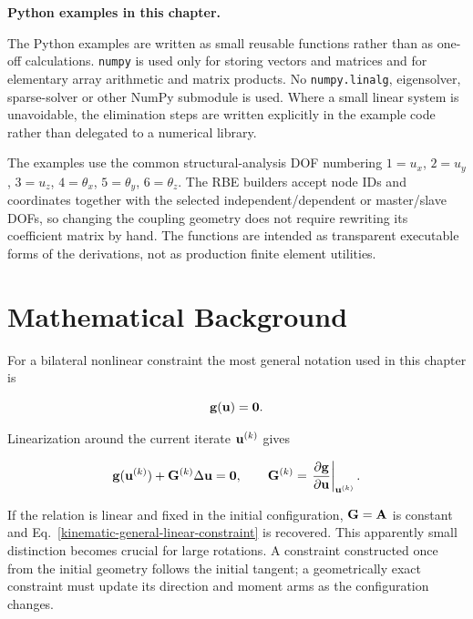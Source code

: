 \begin{bbox}
\textbf{Python examples in this chapter.}

The Python examples are written as small reusable functions rather than as
one-off calculations. \texttt{numpy} is used only for storing vectors and
matrices and for elementary array arithmetic and matrix products. No
\texttt{numpy.linalg}, eigensolver, sparse-solver or other NumPy submodule is
used. Where a small linear system is unavoidable, the elimination steps are
written explicitly in the example code rather than delegated to a numerical
library.

The examples use the common structural-analysis DOF numbering
$1=u_x$, $2=u_y$, $3=u_z$, $4=\theta_x$, $5=\theta_y$, $6=\theta_z$.
The RBE builders accept node IDs and coordinates together with the selected
independent/dependent or master/slave DOFs, so changing the coupling geometry
does not require rewriting its coefficient matrix by hand. The functions are
intended as transparent executable forms of the derivations, not as production
finite element utilities.
\end{bbox}

\section{Mathematical Background}

For a bilateral nonlinear constraint the most general notation used in this
chapter is

\begin{equation}\label{kinematic-general-nonlinear-constraint}
    \mathbf{g}(\mathbf{u})=\mathbf{0}.
\end{equation}

Linearization around the current iterate $\mathbf{u}^{(k)}$ gives

\begin{equation}
    \mathbf{g}(\mathbf{u}^{(k)})+
    \mathbf{G}^{(k)}\Delta\mathbf{u}=\mathbf{0},
    \qquad
    \mathbf{G}^{(k)}=\left.\frac{\partial\mathbf{g}}{\partial\mathbf{u}}\right|_{\mathbf{u}^{(k)}}.
\end{equation}

If the relation is linear and fixed in the initial configuration,
$\mathbf{G}=\mathbf{A}$ is constant and Eq.~\eqref{kinematic-general-linear-constraint}
is recovered. This apparently small distinction becomes crucial for large
rotations. A constraint constructed once from the initial geometry follows the
initial tangent; a geometrically exact constraint must update its direction and
moment arms as the configuration changes.

